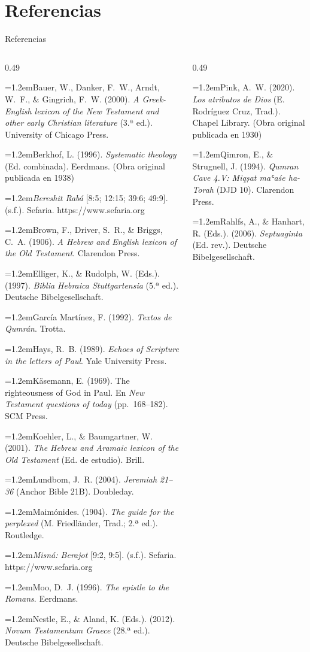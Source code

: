 \documentclass[hyperref={bookmarks=false},aspectratio=169]{beamer}
\newcommand{\refapa}[1]{\par{\RaggedRight\hangindent=1.2em\hangafter=1\noindent #1\par}\vspace{3pt}}
\begin{document}
\section{Referencias}

\begin{frame}{Referencias}
\fontsize{5.0}{6.0}\selectfont
\begin{columns}[t,onlytextwidth]
\begin{column}{0.49\textwidth}
\refapa{Bauer, W., Danker, F.~W., Arndt, W.~F., \& Gingrich, F.~W. (2000). \emph{A Greek-English lexicon of the New Testament and other early Christian literature} (3.ª ed.). University of Chicago Press.}
\refapa{Berkhof, L. (1996). \emph{Systematic theology} (Ed. combinada). Eerdmans. (Obra original publicada en 1938)}
\refapa{\emph{Bereshit Rabá} [8:5; 12:15; 39:6; 49:9]. (s.f.). Sefaria. https://www.sefaria.org}
\refapa{Brown, F., Driver, S.~R., \& Briggs, C.~A. (1906). \emph{A Hebrew and English lexicon of the Old Testament}. Clarendon Press.}
\refapa{Elliger, K., \& Rudolph, W. (Eds.). (1997). \emph{Biblia Hebraica Stuttgartensia} (5.ª ed.). Deutsche Bibelgesellschaft.}
\refapa{García Martínez, F. (1992). \emph{Textos de Qumrán}. Trotta.}
\refapa{Hays, R.~B. (1989). \emph{Echoes of Scripture in the letters of Paul}. Yale University Press.}
\refapa{Käsemann, E. (1969). The righteousness of God in Paul. En \emph{New Testament questions of today} (pp.~168--182). SCM Press.}
\refapa{Koehler, L., \& Baumgartner, W. (2001). \emph{The Hebrew and Aramaic lexicon of the Old Testament} (Ed. de estudio). Brill.}
\refapa{Lundbom, J.~R. (2004). \emph{Jeremiah 21--36} (Anchor Bible 21B). Doubleday.}
\refapa{Maimónides. (1904). \emph{The guide for the perplexed} (M. Friedländer, Trad.; 2.ª ed.). Routledge.}
\refapa{\emph{Misná: Berajot} [9:2, 9:5]. (s.f.). Sefaria. https://www.sefaria.org}
\refapa{Moo, D.~J. (1996). \emph{The epistle to the Romans}. Eerdmans.}
\refapa{Nestle, E., \& Aland, K. (Eds.). (2012). \emph{Novum Testamentum Graece} (28.ª ed.). Deutsche Bibelgesellschaft.}
\end{column}
\begin{column}{0.49\textwidth}
\refapa{Pink, A.~W. (2020). \emph{Los atributos de Dios} (E. Rodríguez Cruz, Trad.). Chapel Library. (Obra original publicada en 1930)}
\refapa{Qimron, E., \& Strugnell, J. (1994). \emph{Qumran Cave 4.V: Miqṣat maʿaśe ha-Torah} (DJD 10). Clarendon Press.}
\refapa{Rahlfs, A., \& Hanhart, R. (Eds.). (2006). \emph{Septuaginta} (Ed. rev.). Deutsche Bibelgesellschaft.}

\end{column}
\end{columns}
\end{frame}
\end{document}
